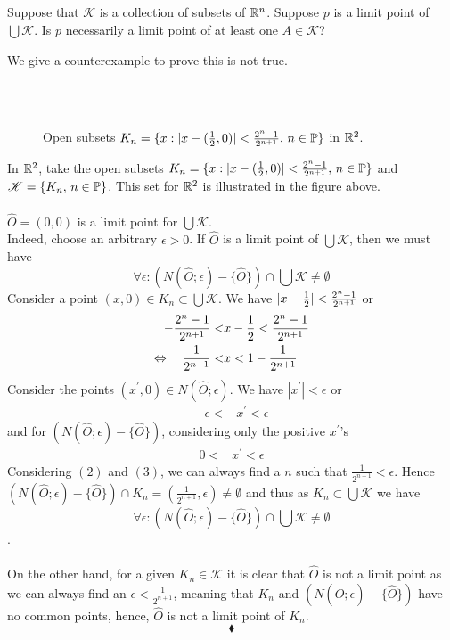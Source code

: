 \subsection{}
\begin{tcolorbox}

Suppose that $\mathscr{K}$ is a collection of subsets of $\mathbb{R}^n$. Suppose $p$ is a limit point of $\bigcup \mathscr{K}$. Is $p$ necessarily a limit point of at least one $A\in \mathscr{K}$?
\end{tcolorbox}
We give a counterexample to prove this is not true.\\\
\begin{figure}[H]%
    \centering
\\
\caption{Open subsets $K_n=\{x:|x-(\frac{1}{2},0)|< \frac{2^n-1  }{2^{n+1}},\, n\in\mathbb{P}\}$ in $\mathbb{R}^2$.}
\label{fig:fig_p8a}
\end{figure}
In $\mathbb{R}^2$, take the open subsets $K_n=\{x:|x-(\frac{1}{2},0)|<\frac{2^n-1}{2^{n+1}},\, n\in \mathbb{P}\}$ and $\mathscr{K}=\{K_n,\,n\in \mathbb{P} \}$. This set for $\mathbb{R}^2$ is illustrated in the figure above.\\\\
$\hat{O}=(0,0)$ is a limit point for $\bigcup \mathscr{K}$. \\
Indeed, choose an arbitrary $\epsilon >0$. If $\hat{O}$ is a limit point of $\bigcup \mathscr{K}$, then we must have 
$$\forall \epsilon :\left(N(\hat{O};\epsilon)-\{\hat{O}\}\right)\cap \bigcup \mathscr{K}\neq \emptyset$$ Consider a point $(x,0)\in K_n\subset \bigcup \mathscr{K} $. We have $|x-\frac{1}{2}|<\frac{2^n-1}{2^{n+1}}$ or 
\begin{align}
-\frac{2^n-1}{2^{n+1}}<&x-\frac{1}{2}<\frac{2^n-1}{2^{n+1}}\\
\Leftrightarrow\quad  \frac{1}{2^{n+1}}<&x<1-\frac{1}{2^{n+1}}
\end{align}
Consider the points $(x^{'},0)\in N(\hat{O};\epsilon)$. We have $|x^{'}|<\epsilon$ or 
\begin{align*}
-\epsilon<&x^{'}<\epsilon
\end{align*}
and for $\left(N(\hat{O};\epsilon)-\{\hat{O}\}\right)$, considering only the positive $x^{'}$'s
\begin{align}
0<&x^{'}<\epsilon
\end{align}
Considering $(2)$ and $(3)$, we can always find a $n$ such that $\frac{1}{2^{n+1}}<\epsilon$. Hence  $\left(N(\hat{O};\epsilon)-\{\hat{O}\}\right)\cap K_n= \left(\frac{1}{2^{n+1}},\epsilon\right)\neq \emptyset$ and thus as $K_n\subset  \bigcup \mathscr{K}$ we have
$$\forall \epsilon :\left(N(\hat{O};\epsilon)-\{\hat{O}\}\right)\cap \bigcup \mathscr{K}\neq \emptyset$$.\\\\
On the other hand, for a given $K_n\in \mathscr{K}$ it is clear that $\hat{O}$ is not a limit point as we can always find an $\epsilon < \frac{1}{2^{n+1}}$, meaning that $K_n$ and $\left(N(\hat{O};\epsilon)-\{\hat{O}\}\right)$ have no common points, hence, $\hat{O}$ is not a limit point of $K_n$.
$$\blacklozenge$$\\


